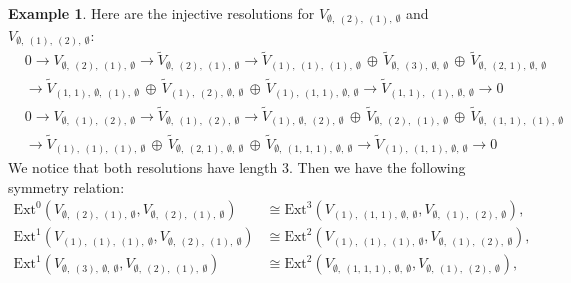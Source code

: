 \documentclass[openany, a4paper]{amsbook}
\theoremstyle{definition}
\newtheorem{exmp}[thm]{Example}
\numberwithin{equation}{chapter}
\newcommand{\Ext}[4]{\mathrm{Ext}^{#1}_{#2}({#3}, {#4})}
\begin{document}
\begin{exmp}
    Here are the injective resolutions for $V_{ \emptyset, \ (2), \ (1), \ \emptyset }$ and $V_{ \emptyset, \ (1), \ (2), \ \emptyset }$:
    \begin{align*}
        & 0 \to 
        V_{ \emptyset, \ (2), \ (1), \ \emptyset }\to
        \tilde{V}_{ \emptyset, \ (2), \ (1), \ \emptyset }
        \to
        \tilde{V}_{ (1), \ (1), \ (1), \ \emptyset }\,\oplus\,\tilde{V}_{ \emptyset, \ (3), \ \emptyset, \ \emptyset }\,\oplus\,\tilde{V}_{ \emptyset, \ (2,\,1), \ \emptyset, \ \emptyset } \\ &
        \to 
        \tilde{V}_{ (1,\,1), \ \emptyset, \ (1), \ \emptyset }\,\oplus\,\tilde{V}_{ (1), \ (2), \ \emptyset, \ \emptyset }\,\oplus\,\tilde{V}_{ (1), \ (1,\,1), \ \emptyset, \ \emptyset }
        \to
        \tilde{V}_{ (1,\,1), \ (1), \ \emptyset, \ \emptyset }
        \to 0 \\
       & 0 \to 
        V_{ \emptyset, \ (1), \ (2), \ \emptyset }\to
        \tilde{V}_{ \emptyset, \ (1), \ (2), \ \emptyset }
        \to
        \tilde{V}_{ (1), \ \emptyset, \ (2), \ \emptyset }\,\oplus\,\tilde{V}_{ \emptyset, \ (2), \ (1), \ \emptyset }\,\oplus\,\tilde{V}_{ \emptyset, \ (1,\,1), \ (1), \ \emptyset } \\ &
        \to
        \tilde{V}_{ (1), \ (1), \ (1), \ \emptyset }\,\oplus\,\tilde{V}_{ \emptyset, \ (2,\,1), \ \emptyset, \ \emptyset }\,\oplus\,\tilde{V}_{ \emptyset, \ (1,\,1,\,1), \ \emptyset, \ \emptyset }
        \to
        \tilde{V}_{ (1), \ (1,\,1), \ \emptyset, \ \emptyset }
        \to 0
    \end{align*}
    We notice that both resolutions have length 3. Then we have the following symmetry relation:
    \begin{align*}
        \Ext{0}{}{V_{\emptyset, \ (2), \ (1), \ \emptyset}}{V_{ \emptyset, \ (2), \ (1), \ \emptyset }} & \cong 
        \Ext{3}{}{V_{ (1), \ (1,\,1), \ \emptyset, \ \emptyset }}{V_{\emptyset, \ (1), \ (2), \ \emptyset }}, \\ 
        \Ext{1}{}{V_{(1), \ (1), \ (1), \ \emptyset }}{V_{\emptyset, \ (2), \ (1), \ \emptyset }} 
        & \cong 
        \Ext{2}{}{V_{ (1), \ (1), \ (1), \ \emptyset }}{V_{\emptyset, \ (1), \ (2), \ \emptyset }},\\ 
        \Ext{1}{}{V_{\emptyset, \ (3), \ \emptyset, \ \emptyset }}{V_{\emptyset, \ (2), \ (1), \ \emptyset }} 
        & \cong 
        \Ext{2}{}{V_{ \emptyset, \ (1,\,1,\,1), \ \emptyset, \ \emptyset }}{V_{\emptyset, \ (1), \ (2), \ \emptyset }},\\

\end{align*}
\end{exmp}
\end{document}
